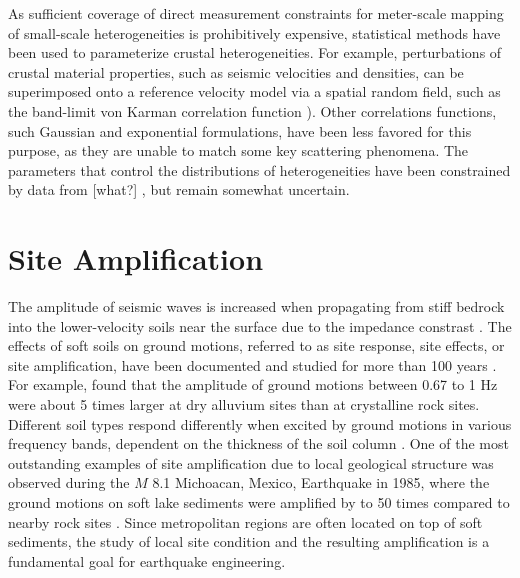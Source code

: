 As sufficient coverage of direct measurement constraints for meter-scale mapping of small-scale heterogeneities is prohibitively expensive, statistical methods have been used to parameterize crustal heterogeneities. For example, perturbations of crustal material properties, such as seismic velocities and densities, can be superimposed onto a reference velocity model via a spatial random field, such as the band-limit von Karman correlation function \citep[][\cref{app:A}]{frankelFiniteDifferenceSimulations1986,hartzellEffects3DRandom2010}). Other correlations functions, such Gaussian and exponential formulations, have been less favored for this purpose, as they are unable to match some key scattering phenomena. The parameters that control the distributions of heterogeneities have been constrained by data from [what?]   \citep{thyboSeismicScatteringTop2003,nielsenIdentificationCrustalUpper2006, przybillaEstimationCrustalScattering2009, imperatoriBroadbandNearfieldGround2013, imperatoriRoleTopographyLateral2015}, but remain somewhat uncertain.


\section{Site Amplification}

The amplitude of seismic waves is increased when propagating from stiff bedrock into the lower-velocity soils near the surface due to the impedance constrast \citep{booreShortperiodSwaveRadiation1986,silvaEngineeringCharacterizationStrong1995}. The effects of soft soils on ground motions, referred to as site response, site effects, or site amplification, have been documented and studied for more than 100 years . For example, \citet{gutenbergEffectsGroundEarthquake1957} found that the amplitude of ground motions between 0.67 to 1 Hz were about 5 times larger at dry alluvium sites than at crystalline rock sites.  Different soil types respond differently when excited by ground motions in various frequency bands, dependent on the thickness of the soil column \citep{akiLocalSiteEffects1993}. One of the most outstanding examples of site amplification due to local geological structure was observed during the $M$ 8.1 Michoacan, Mexico, Earthquake in 1985, where the ground motions on soft lake sediments were amplified by to 50 times compared to nearby rock sites \citep{singh1993origin}. Since metropolitan regions are often located on top of soft sediments, the study of local site condition and the resulting amplification is a fundamental goal for earthquake engineering.

